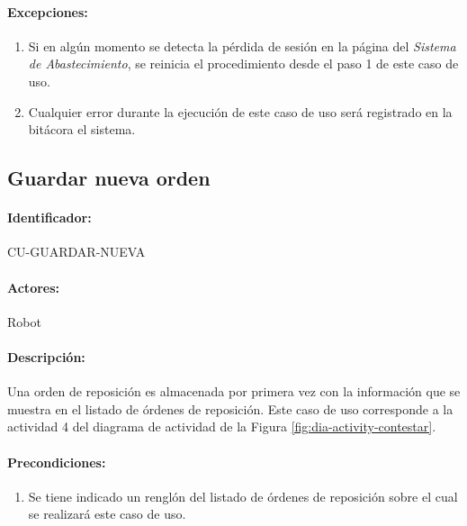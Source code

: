 \paragraph{Excepciones:}
\begin{enumerate}
  \item Si en algún momento se detecta la pérdida de sesión en la página del \textit{Sistema de Abastecimiento}, se reinicia el procedimiento desde el paso 1 de este caso de uso.
  \item Cualquier error durante la ejecución de este caso de uso será registrado en la bitácora el sistema.
\end{enumerate}


\subsection{Guardar nueva orden}\label{cu-guardar-nueva}
\paragraph{Identificador:}
CU-GUARDAR-NUEVA
\paragraph{Actores:}
Robot
\paragraph{Descripción:}
Una orden de reposición es almacenada por primera vez con la información que se muestra en el listado de órdenes de reposición. Este caso de uso corresponde a la actividad 4 del diagrama de actividad de la Figura \ref{fig:dia-activity-contestar}.
\paragraph{Precondiciones:}
\begin{enumerate}
  \item Se tiene indicado un renglón del listado de órdenes de reposición sobre el cual se realizará este caso de uso.
\end{enumerate}
